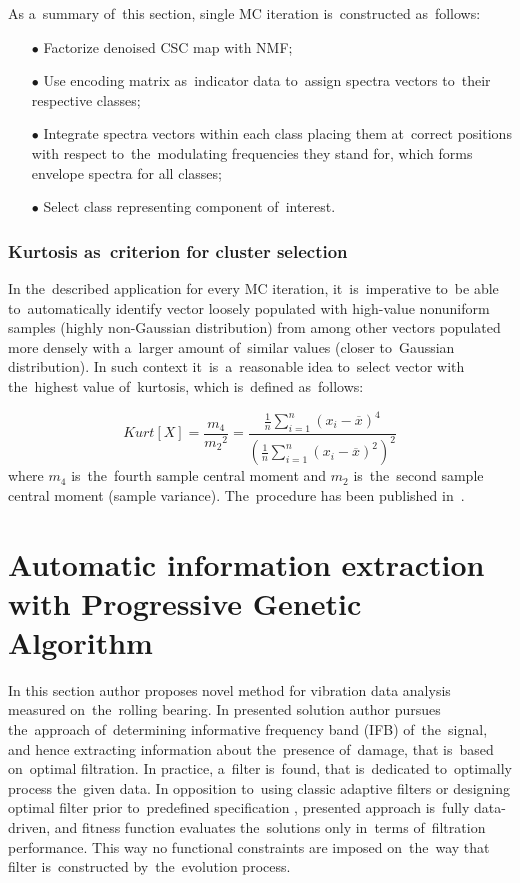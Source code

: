 As a~summary of~this section, single MC iteration is~constructed as~follows:

\begin{itemize}
  \item[$\bullet$] Factorize denoised CSC map with NMF;
  \item[$\bullet$] Use encoding matrix as~indicator data to~assign spectra vectors to~their respective classes;
  \item[$\bullet$] Integrate spectra vectors within each class placing them at~correct positions with respect to~the~modulating frequencies they stand for, which forms envelope spectra for all classes;
  \item[$\bullet$] Select class representing component of~interest.
\end{itemize}

\subsubsection{Kurtosis as~criterion for cluster selection}

In the~described application for every MC iteration, it~is~imperative to~be able to~automatically identify vector loosely populated with high-value nonuniform samples (highly non-Gaussian distribution) from among other vectors populated more densely with a~larger amount of~similar values (closer to~Gaussian distribution). In such context it~is~a~reasonable idea to~select vector with the~highest value of~kurtosis, which is~defined as~follows:

\begin{equation}
\label{eq:kurtosis}
Kurt[X]=\frac{m_4}{{m_2}^2}=\frac{\frac{1}{n} \sum_{i=1}^{n} \left(x_i - \overline{x} \right)^4}{\left({\frac{1}{n} \sum_{i=1}^{n} \left(x_i - \overline{x} \right)^2}\right)^2}
\end{equation}
where $m_4$ is~the~fourth sample central moment and $m_2$ is~the~second sample central moment (sample variance). The~procedure has been published in~\cite{wodecki2019impulsive}.


\newpage
\section{Automatic information extraction with Progressive Genetic Algorithm}\label{met_pga}

In this section author proposes novel method for vibration data analysis measured on~the~rolling bearing. In presented solution author pursues the~approach of~determining informative frequency band (IFB) of~the~signal, and hence extracting information about the~presence of~damage, that is~based on~optimal filtration. In practice, a~filter is~found, that is~dedicated to~optimally process the~given data. In opposition to~using classic adaptive filters \cite{makowski2014new,makowski2013procedure} or designing optimal filter prior to~predefined specification \cite{nilsson2003digital}, presented approach is~fully data-driven, and fitness function evaluates the~solutions only in~terms of~filtration performance. This way no functional constraints are imposed on~the~way that filter is~constructed by~the~evolution process. 


